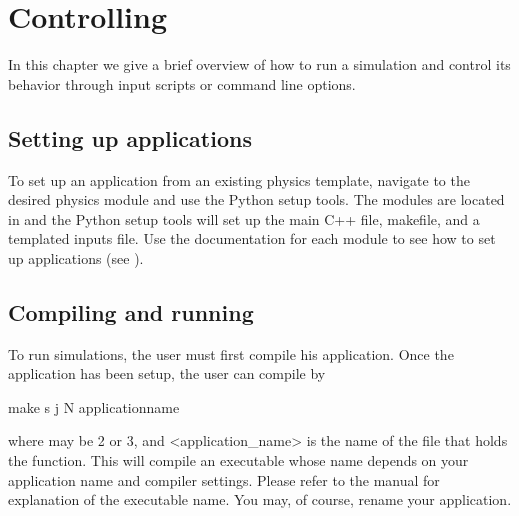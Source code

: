 \documentclass[letterpaper,10pt,english]{sphinxmanual}
\begin{document}
\section{Controlling }
\label{\detokenize{Base/Control:controlling-chombo-discharge}}\label{\detokenize{Base/Control:chap-control}}\label{\detokenize{Base/Control::doc}}
In this chapter we give a brief overview of how to run a  simulation and control its behavior through input scripts or command line options.


\subsection{Setting up applications}
\label{\detokenize{Base/Control:setting-up-applications}}
To set up an application from an existing physics template, navigate to the desired physics module and use the Python setup tools.
The modules are located in  and the Python setup tools will set up the main C++ file, makefile, and a templated inputs file.
Use the documentation for each module to see how to set up applications (see {\hyperref[\detokenize{Applications/ImplementedModels:chap-implementedmodels}]{}}).


\subsection{Compiling and running}
\label{\detokenize{Base/Control:compiling-and-running}}
To run simulations, the user must first compile his application.
Once the application has been setup, the user can compile by

\begin{sphinxVerbatim}[commandchars=\\\{\},formatcom=\scriptsize]
make \PYGZhy{}s \PYGZhy{}j  N \PYGZlt{}application\PYGZus{}name\PYGZgt{}
\end{sphinxVerbatim}

where  may be 2 or 3, and \textless{}application\_name\textgreater{} is the name of the file that holds the  function.
This will compile an executable whose name depends on your application name and compiler settings.
Please refer to the  manual for explanation of the executable name. You may, of course, rename your application.
\end{document}
